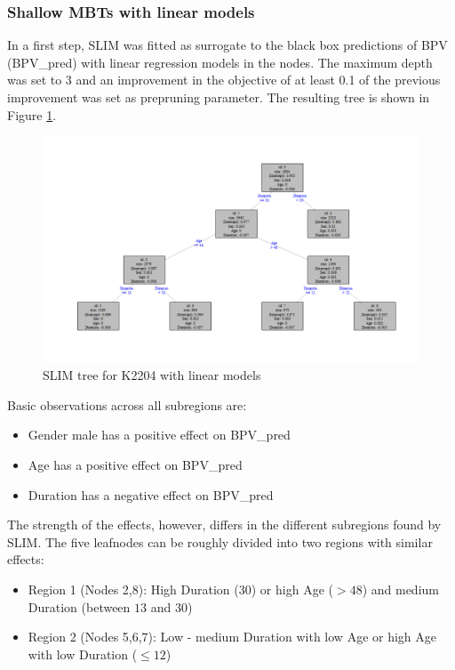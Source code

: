\subsubsection{Shallow MBTs with linear models}
In a first step, SLIM was fitted as surrogate to the black box predictions of BPV (BPV\_pred) with linear regression models in the nodes. The maximum depth was set to 3 and an improvement in the objective of at least 0.1 of the previous improvement was set as prepruning parameter.
 The resulting tree is shown in Figure \ref{fig:ins_slim_lm_tree}.

 \begin{figure}[!htb]
     \centering     
     \includegraphics[width = 14cm]{Figures/insurance_use_case/k2204_BPV/slim_lm_tree.png}
     \caption{SLIM tree for K2204 with linear models}
     \label{fig:ins_slim_lm_tree}
 \end{figure}

Basic observations across all subregions are:
\begin{itemize}
    \item Gender male has a positive effect on BPV\_pred
    \item Age has a positive effect on BPV\_pred
    \item Duration has a negative effect on BPV\_pred
\end{itemize}

The strength of the effects, however, differs in the different subregions found by SLIM.
The five leafnodes can be roughly divided into two regions with similar effects:
\begin{itemize}
    \item Region 1 (Nodes 2,8): High Duration ($30$) or high Age ($>48$) and medium Duration (between $13$ and $30$)
    \item Region 2 (Nodes 5,6,7): Low - medium Duration with low Age or high Age with low Duration ($\leq 12$)
\end{itemize}

